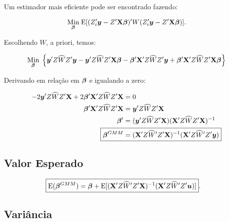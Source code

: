 \documentclass[11pt, oneside, a4paper, article]{article}
\numberwithin{equation}{section}
\begin{document}
\begin{description}
\begin{description}
Um estimador mais eficiente pode ser encontrado fazendo:

\vspace{-1 em}
\begin{align*}
\underset{\boldsymbol{\beta}}{\text{Min}} \;
\text{E}[ ( Z_{i}' \boldsymbol{y} - Z' \mathbf{X} \boldsymbol{\beta} )' W ( Z_{i}' \boldsymbol{y} - Z' \mathbf{X} \boldsymbol{\beta} ) ].
\end{align*}

\noindent
Escolhendo $\widehat{W}$, a priori, temos:

\vspace{-1 em}
\begin{align*}
\underset{\boldsymbol{\beta}}{\text{Min}} \;
\left\{ 
\boldsymbol{y}' Z \widehat{W} Z' \boldsymbol{y}
-
\boldsymbol{y}' Z \widehat{W} Z' \mathbf{X} \boldsymbol{\beta}
-
\boldsymbol{\beta}' \mathbf{X}'  Z \widehat{W} Z' \boldsymbol{y}
+
\boldsymbol{\beta}' \mathbf{X}'  Z \widehat{W} Z' \mathbf{X} \boldsymbol{\beta}
\right\}
\end{align*}

Derivando em relação em $\boldsymbol{\beta}$ e igualando a zero:

\vspace{-1 em}
\begin{align*}
-2 \mbs{y}' Z \widehat{W} Z' \Xmat + 2 \mbs{\beta}'\Xmat' Z \widehat{W} Z' \Xmat &= 0
\\
\mbs{\beta}'\Xmat' Z \widehat{W} Z' \Xmat &= \mbs{y}' Z \widehat{W} Z' \Xmat 
\\
\mbs{\beta}' &= ( \mbs{y}' Z \widehat{W} Z' \Xmat ) ( \Xmat' Z \widehat{W} Z' \Xmat )^{-1}
\\
\Aboxed{
\mbs{\beta}^{GMM} &= ( \Xmat' Z \widehat{W}' Z' \Xmat )^{-1} ( \Xmat' Z \widehat{W}' Z' \mbs{y} ) }
\end{align*}

\subsection*{Valor Esperado} 

\vspace{-1 em}
\begin{align*}
\Aboxed{
\E( \mbs{\beta}^{GMM} ) &=
\mbs{\beta} +
\E[ ( \Xmat' Z \widehat{W}' Z' \Xmat )^{-1} ( \Xmat' Z \widehat{W}' Z' \mbs{u} ) ] }.
\end{align*}

\subsection*{Variância} 


\end{description}
\end{description}
\end{document}
